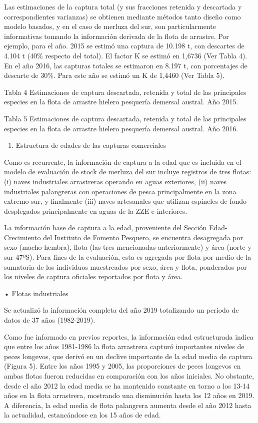 \documentclass[
  spanish,
]{article}
\providecommand{\tightlist}{%
  \setlength{\itemsep}{0pt}\setlength{\parskip}{0pt}}
\begin{document}
Las estimaciones de la captura total (y sus fracciones retenida y
descartada y correspondientes varianzas) se obtienen mediante métodos
tanto diseño como modelo basados, y en el caso de merluza del sur, son
particularmente informativas tomando la información derivada de la flota
de arrastre. Por ejemplo, para el año. 2015 se estimó una captura de
10.198 t, con descartes de 4.104 t (40\% respecto del total). El factor
K se estimó en 1,6736 (Ver Tabla 4). En el año 2016, las capturas
totales se estimaron en 8.197 t, con porcentajes de descarte de 30\%.
Para este año se estimó un K de 1,4460 (Ver Tabla 5).

Tabla 4 Estimaciones de captura descartada, retenida y total de las
principales especies en la flota de arrastre hielero pesquería demersal
austral. Año 2015.

Tabla 5 Estimaciones de captura descartada, retenida y total de las
principales especies en la flota de arrastre hielero pesquería demersal
austral. Año 2016.

\begin{enumerate}
\def\labelenumi{\alph{enumi})}
\setcounter{enumi}{1}
\tightlist
\item
  Estructura de edades de las capturas comerciales
\end{enumerate}

Como es recurrente, la información de captura a la edad que es incluida
en el modelo de evaluación de stock de merluza del sur incluye registros
de tres flotas: (i) naves industriales arrastreras operando en aguas
exteriores, (ii) naves industriales palangreras con operaciones de pesca
principalmente en la zona extremo sur, y finalmente (iii) naves
artesanales que utilizan espineles de fondo desplegados principalmente
en aguas de la ZZE e interiores.

La información base de captura a la edad, proveniente del Sección
Edad-Crecimiento del Instituto de Fomento Pesquero, se encuentra
desagregada por sexo (macho-hembra), flota (las tres mencionadas
anteriormente) y área (norte y sur 47ºS). Para fines de la evaluación,
esta es agregada por flota por medio de la sumatoria de los individuos
muestreados por sexo, área y flota, ponderados por los niveles de
captura oficiales reportados por flota y área.

• Flotas industriales

Se actualizó la información completa del año 2019 totalizando un periodo
de datos de 37 años (1982-2019).

Como fue informado en previos reportes, la información edad estructurada
indica que entre los años 1981-1986 la flota arrastrera capturó
importantes niveles de peces longevos, que derivó en un declive
importante de la edad media de captura (Figura 5). Entre los años 1995 y
2005, las proporciones de peces longevos en ambas flotas fueron
reducidas en comparación con los años iniciales. No obstante, desde el
año 2012 la edad media se ha mantenido constante en torno a los 13-14
años en la flota arrastrera, mostrando una disminución hasta los 12 años
en 2019. A diferencia, la edad media de flota palangrera aumenta desde
el año 2012 hasta la actualidad, estancándose en los 15 años de edad.
\end{document}

